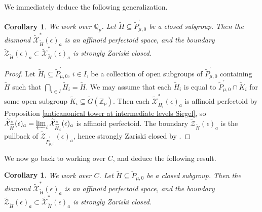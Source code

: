 \documentclass{amsart}
\newtheorem{cor}[subsubsection]{Corollary}
\theoremstyle{remark}
\numberwithin{equation}{subsection}
\newcommand{\Q}{\QQ}
\newcommand{\Z}{\ZZ}
\newcommand{\QQ}{{\mathbb Q}}
\newcommand{\ZZ}{{\mathbb Z}}
\newcommand{\cX}{{\mathcal X}}
\newcommand{\cZ}{{\mathcal Z}}
\newcommand{\Zp}{\Z_p}
\newcommand{\Qp}{\Q_p}
\newcommand*{\invlim}{\varprojlim}
\newcommand{\tG}{\widetilde{G}}
\newcommand{\tK}{{\widetilde{K}}}
\newcommand{\tH}{\widetilde{H}}
\newcommand{\tP}{\widetilde{P}}
\newcommand{\wt}{\widetilde}
\newcommand{\sub}{\subseteq}
\renewcommand{\(}{\left(}
\renewcommand{\)}{\right)}
\begin{document}
We immediately deduce the following generalization.

\begin{cor}\label{anticanonical tower at intermediate levels 2 Siegel Qp} We work over $\Qp$. Let $\tH \sub \tP_{\mu,0}^{\prime}$ be a closed subgroup. Then the diamond $\wt{\cX}^{\ast}_{\tH}(\epsilon)_a$ is an affinoid perfectoid space, and the boundary $\wt{\cZ}_{\tH}(\epsilon)_a \subset \wt{\cX}^{\ast}_{\tH}(\epsilon)_a$ is strongly Zariski closed. 
\end{cor}

\begin{proof}
Let $\tH_{i} \sub \tP_{\mu,0}^{\prime}$, $i\in I$, be a collection of open subgroups of $\tP^{\prime}_{\mu,0}$ containing $\tH$ such that $\bigcap_{i\in I}\tH_{i} = \tH$. We may assume that each $\tH_{i}$ is equal to $\tP_{\mu,0}^{\prime} \cap \tK_{i}$ for some open subgroup $\tK_{i} \sub \tG(\Zp)$. Then each $\wt{\cX}^\ast_{\tH_{i}}(\epsilon)_{a}$ is affinoid perfectoid by Proposition \ref{anticanonical tower at intermediate levels Siegel}, so $\wt{\cX}^{\ast}_{\tH}(\epsilon)_a = \invlim_{i} \wt{\cX}^{\ast}_{\tH_{i}}(\epsilon)_a$ is affinoid perfectoid. The boundary $\wt{\cZ}_{\tH}(\epsilon)_a$ is the pullback of $\wt{\cZ}_{\tP_{\mu,0}^{\prime}}(\epsilon)_a$, hence strongly Zariski closed by \cite[Lemma 2.2.9]{scholze-galois}.
\end{proof}

We now go back to working over $C$, and deduce the following result.

\begin{cor}\label{anticanonical tower at intermediate levels 2 Siegel}
We work over $C$. Let $\tH \sub \tP_{\mu,0}$ be a closed subgroup. Then the diamond $\wt{\cX}^{\ast}_{\tH}(\epsilon)_a$
is an affinoid perfectoid space, and the boundary $ \wt{\cZ}_{\tH}(\epsilon)_a \subset \wt{\cX}^{\ast}_{\tH}(\epsilon)_a $ is strongly Zariski closed.
\end{cor}
\end{document}
